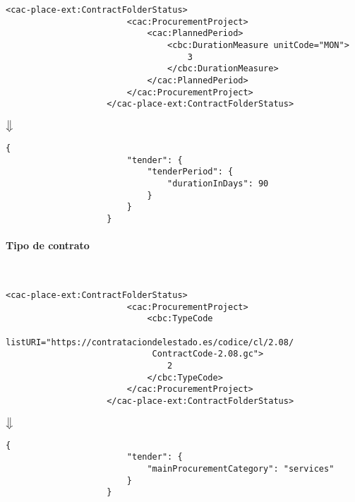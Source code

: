                 \begin{lstlisting}[language=lXML]
                    <cac-place-ext:ContractFolderStatus>
                        <cac:ProcurementProject>
                            <cac:PlannedPeriod>
                                <cbc:DurationMeasure unitCode="MON">
                                    3
                                </cbc:DurationMeasure>
                            </cac:PlannedPeriod>
                        </cac:ProcurementProject>
                    </cac-place-ext:ContractFolderStatus>
                \end{lstlisting}
                
                
                \begin{center}
                    $\big\Downarrow$
                \end{center}
                
                \begin{lstlisting}[language=lJSON]
                    {
                        "tender": {
                            "tenderPeriod": {
                                "durationInDays": 90
                            }
                        }
                    }
                \end{lstlisting}
            
            \paragraph{Tipo de contrato} \mbox{}\\
                \begin{lstlisting}[language=lXML]
                    <cac-place-ext:ContractFolderStatus>
                        <cac:ProcurementProject>
                            <cbc:TypeCode
                             listURI="https://contrataciondelestado.es/codice/cl/2.08/
                             ContractCode-2.08.gc">
                                2
                            </cbc:TypeCode>
                        </cac:ProcurementProject>
                    </cac-place-ext:ContractFolderStatus>
                \end{lstlisting}
                
                \begin{center}
                    $\big\Downarrow$
                \end{center}
                
                \begin{lstlisting}[language=lJSON]
                    {
                        "tender": {
                            "mainProcurementCategory": "services"
                        }
                    }
                \end{lstlisting}
\newpage
